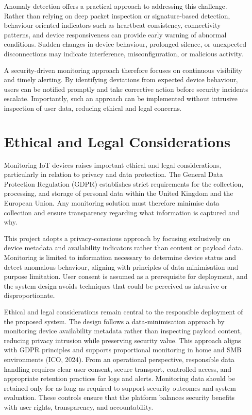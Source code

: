 Anomaly detection offers a practical approach to addressing this challenge. Rather than relying on deep packet inspection or signature-based detection, behaviour-oriented indicators such as heartbeat consistency, connectivity patterns, and device responsiveness can provide early warning of abnormal conditions. Sudden changes in device behaviour, prolonged silence, or unexpected disconnections may indicate interference, misconfiguration, or malicious activity.

A security-driven monitoring approach therefore focuses on continuous visibility and timely alerting. By identifying deviations from expected device behaviour, users can be notified promptly and take corrective action before security incidents escalate. Importantly, such an approach can be implemented without intrusive inspection of user data, reducing ethical and legal concerns.

\section{Ethical and Legal Considerations}

Monitoring IoT devices raises important ethical and legal considerations, particularly in relation to privacy and data protection. The General Data Protection Regulation (GDPR) establishes strict requirements for the collection, processing, and storage of personal data within the United Kingdom and the European Union. Any monitoring solution must therefore minimise data collection and ensure transparency regarding what information is captured and why.

This project adopts a privacy-conscious approach by focusing exclusively on device metadata and availability indicators rather than content or payload data. Monitoring is limited to information necessary to determine device status and detect anomalous behaviour, aligning with principles of data minimisation and purpose limitation. User consent is assumed as a prerequisite for deployment, and the system design avoids techniques that could be perceived as intrusive or disproportionate.

Ethical and legal considerations remain central to the responsible deployment of the proposed system. The design follows a data-minimisation approach by monitoring device availability metadata rather than inspecting payload content, reducing privacy intrusion while preserving security value. This approach aligns with GDPR principles and supports proportional monitoring in home and SMB environments (ICO, 2024). From an operational perspective, responsible data handling requires clear user consent, secure transport, controlled access, and appropriate retention practices for logs and alerts. Monitoring data should be retained only for as long as required to support security outcomes and system evaluation. These controls ensure that the platform balances security benefits with user rights, transparency, and accountability.

